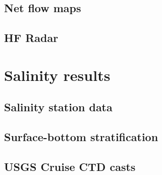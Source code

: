 	\subsection{Net flow maps}	
	\subsection{HF Radar}
\section{Salinity results}
  \subsection{Salinity station data}
  \subsection{Surface-bottom stratification}
	\subsection{USGS Cruise CTD casts}

